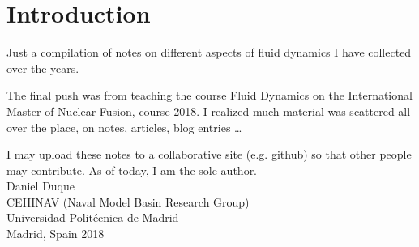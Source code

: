 \chapter*{Introduction}

Just a compilation of notes on different aspects of fluid
dynamics I have collected over the years.

The final push was from teaching the course Fluid Dynamics on the
International Master of Nuclear Fusion, course 2018. I realized much
material was scattered all over the place, on notes, articles, blog
entries \ldots

I may upload these notes to a collaborative site (e.g. github) so that
other people may contribute. As of today, I am the sole author.\\[4cm]

Daniel Duque \\
CEHINAV (Naval Model Basin Research Group) \\
Universidad Polit\'ecnica de Madrid \\
Madrid, Spain 2018
